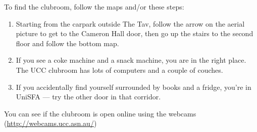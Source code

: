 \label{FindClubroom}



\begin{mdframed}
To find the clubroom, follow the maps and/or these steps:

\begin{enumerate}
	\item Starting from the carpark outside The Tav, follow the arrow on the aerial picture to get to the Cameron Hall door, then go up the stairs to the second floor and follow the bottom map.
	\item If you see a coke machine and a snack machine, you are in the right place. The UCC clubroom has lots of computers and a couple of couches.
	\item If you accidentally find yourself surrounded by books and a fridge, you're in UniSFA --- try the other door in that corridor.
\end{enumerate}

You can see if the clubroom is open online using the webcams (\url{http://webcams.ucc.asn.au/})

\end{mdframed}
